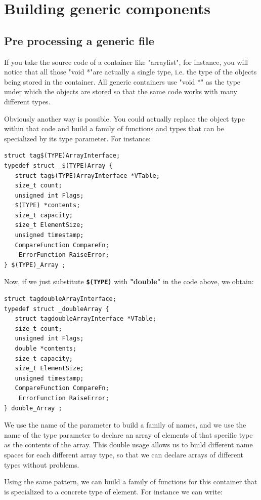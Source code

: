 \documentclass[12pt,a4paper]{memoir} %
\begin{document}
{{\chapter{Building generic components}
\section{Pre processing a generic file}
If you take the source code of a container like "arraylist", for instance, you will notice that all those "void *"are actually a single type, i.e. the type of the objects being stored in the container.  All generic containers use "void *" as the type under which the objects are stored so that the same code works with many different types.

Obviously another way is possible. You could actually replace the object type within that code and build a family of functions and types that can be specialized by its type parameter. For instance:
\begin{verbatim}
struct tag$(TYPE)ArrayInterface;
typedef struct _$(TYPE)Array {
   struct tag$(TYPE)ArrayInterface *VTable; 
   size_t count;
   unsigned int Flags;
   $(TYPE) *contents;
   size_t capacity;
   size_t ElementSize;
   unsigned timestamp;
   CompareFunction CompareFn; 
    ErrorFunction RaiseError;
} $(TYPE)_Array ;
\end{verbatim}
Now, if we just substitute \textbf{ \texttt{\$(TYPE)}} with \textbf{"double"} in the code above, we obtain:

\begin{verbatim}
struct tagdoubleArrayInterface;
typedef struct _doubleArray {
   struct tagdoubleArrayInterface *VTable; 
   size_t count;
   unsigned int Flags;
   double *contents;
   size_t capacity;
   size_t ElementSize;
   unsigned timestamp;
   CompareFunction CompareFn; 
    ErrorFunction RaiseError;
} double_Array ;
\end{verbatim}

We use the name of the parameter to build a family of names, and we use the name of the type parameter to declare an array of elements of that specific type as the contents of the array. This double usage allows us to build different name spaces for each different array type, so that we can declare arrays of different types without problems.

Using the same pattern, we can build a family of functions for this container that is specialized to a concrete type of element. For instance we can write:

}}
\end{document}
